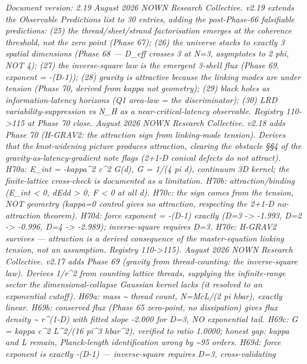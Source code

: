 \documentclass[
]{article}
\begin{document}
\emph{Document version: 2.19 \textbar{} August 2026 \textbar{} NOWN
Research Collective. v2.19 extends the Observable Predictions list to 30
entries, adding the post-Phase-66 falsifiable predictions: (25) the
thread/sheet/strand factorisation emerges at the coherence threshold,
not the zero point (Phase 67); (26) the universe stacks to exactly 3
spatial dimensions (Phase 68 --- D\_eff crosses 3 at N=3, asymptotes to
2 phi, NOT 4); (27) the inverse-square law is the emergent 3-shell flux
(Phase 69, exponent = -(D-1)); (28) gravity is attractive because the
linking modes are under tension (Phase 70, derived from kappa not
geometry); (29) black holes as information-latency horizons (Q1 area-law
= the discriminator); (30) LRD variability-suppression vs N\_H as a
near-critical-latency observable. Registry 110-\textgreater115 at Phase
70 close. \textbar{} August 2026 \textbar{} NOWN Research Collective.
v2.18 adds Phase 70 (H-GRAV2: the attraction sign from linking-mode
tension). Derives that the knot-widening picture produces attraction,
clearing the obstacle §§4 of the gravity-as-latency-gradient note flags
(2+1-D conical defects do not attract). H70a: E\_int = -kappa\^{}2
c\^{}2 G(d), G = 1/(4 pi d), continuum 3D kernel; the finite-lattice
cross-check is documented as a limitation. H70b: attraction/binding
(E\_int \textless{} 0, dEdd \textgreater{} 0, F \textless{} 0 at all d).
H70c: the sign comes from the tension, NOT geometry (kappa=0 control
gives no attraction, respecting the 2+1-D no-attraction theorem). H70d:
force exponent = -(D-1) exactly (D=3 -\textgreater{} -1.993, D=2
-\textgreater{} -0.996, D=4 -\textgreater{} -2.989); inverse-square
requires D=3. H70e: H-GRAV2 survives --- attraction is a derived
consequence of the master-equation linking tension, not an assumption.
Registry 110-\textgreater115). \textbar{} August 2026 \textbar{} NOWN
Research Collective. v2.17 adds Phase 69 (gravity from thread-counting:
the inverse-square law). Derives 1/r\^{}2 from counting lattice threads,
supplying the infinite-range sector the dimensional-collapse Gaussian
kernel lacks (it resolved to an exponential cutoff). H69a: mass
\textasciitilde{} thread count, N=McL/(2 pi hbar), exactly linear. H69b:
conserved flux (Phase 65 zero-point, no dissipation) gives flux density
\textasciitilde{} r\^{}(1-D) with fitted slope -2.000 for D=3, NO
exponential tail. H69c: G = kappa c\^{}2 L\^{}2/(16 pi\^{}3 hbar\^{}2),
verified to ratio 1.0000; honest gap: kappa and L remain, Planck-length
identification wrong by \textasciitilde95 orders. H69d: force exponent
is exactly -(D-1) --- inverse-square requires D=3, cross-validating
}
\end{document}
